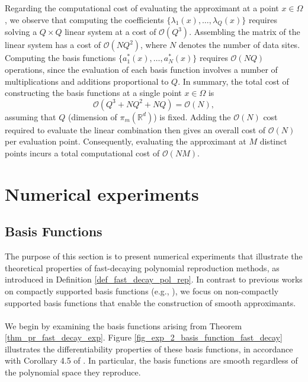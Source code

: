 \documentclass{drna}
\begin{document}
Regarding the computational cost of evaluating the approximant at a point $ x \in \Omega$, we observe that computing the coefficients $\{\lambda_1(x), \dots, \lambda_Q(x)\}$ requires solving a $ Q \times Q$ linear system at a cost of $ \mathcal{O}(Q^3)$. Assembling the matrix of the linear system has a cost of $\mathcal{O}(N Q^2)$, where $N$ denotes the number of data sites. Computing the basis functions $\{a_1^*(x), \dots, a_N^*(x)\}$ requires $\mathcal{O}(N Q)$ operations, since the evaluation of each basis function involves a number of multiplications and additions proportional to $Q$. In summary, the total cost of constructing the basis functions at a single point $x \in \Omega$ is
\begin{equation*}
\mathcal{O}(Q^3 + NQ^2 + NQ) = \mathcal{O}(N),
\end{equation*}
assuming that $Q$ (dimension of $\pi_{m}(\mathbb{R}^d)$) is fixed. Adding the $  \mathcal{O}(N)  $ cost required to evaluate the linear combination then gives an overall cost of $  \mathcal{O}(N)  $ per evaluation point. Consequently, evaluating the approximant at $ M $ distinct points incurs a total computational cost of $  \mathcal{O}(N M) $.

\section{Numerical experiments}
\label{sec_numerical_experiments}
\subsection{Basis Functions}

The purpose of this section is to present numerical experiments that illustrate the theoretical properties of fast-decaying polynomial reproduction methods, as introduced in Definition \ref{def_fast_decay_pol_rep}.
In contrast to previous works on compactly supported basis functions (e.g., \cite{fasshauer_2007}), we focus on non-compactly supported basis functions that enable the construction of smooth approximants.
\\
\\
We begin by examining the basis functions arising from Theorem \ref{thm_pr_fast_decay_exp}. Figure \ref{fig_exp_2_basis_function_fast_decay} illustrates the differentiability properties of these basis functions, in accordance with Corollary 4.5 of \cite{wendland_2004}. In particular, the basis functions are smooth regardless of the polynomial space they reproduce.
\end{document}
